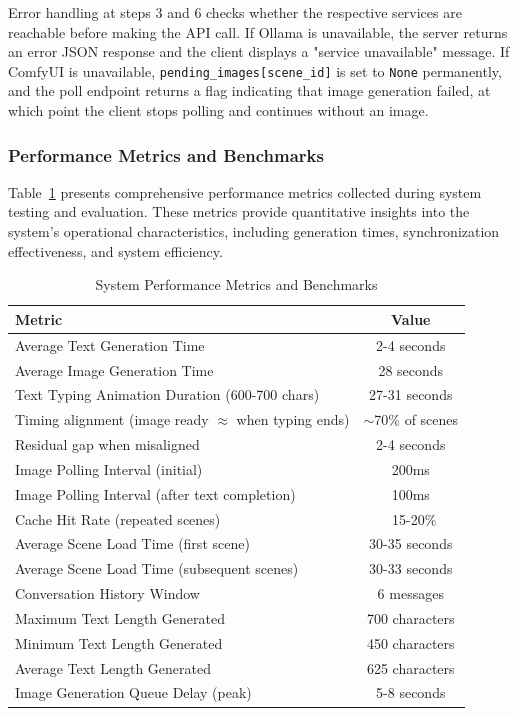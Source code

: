 \documentclass[12pt,a4paper]{article}
\begin{document}
Error handling at steps 3 and 6 checks whether the respective services are reachable before making the API call. If Ollama is unavailable, the server returns an error JSON response and the client displays a "service unavailable" message. If ComfyUI is unavailable, \texttt{pending\_images[scene\_id]} is set to \texttt{None} permanently, and the poll endpoint returns a flag indicating that image generation failed, at which point the client stops polling and continues without an image.

    \subsubsection{Performance Metrics and Benchmarks}

    Table~\ref{tab:performance_metrics} presents comprehensive performance metrics collected during system testing and evaluation. These metrics provide quantitative insights into the system's operational characteristics, including generation times, synchronization effectiveness, and system efficiency.

    \begin{table}[h]
    \centering
    \caption{System Performance Metrics and Benchmarks}
    \label{tab:performance_metrics}
    \begin{tabular}{lc}
    \toprule
    \textbf{Metric} & \textbf{Value} \\
    \midrule
    Average Text Generation Time & 2-4 seconds \\
    Average Image Generation Time & 28 seconds \\
    Text Typing Animation Duration (600-700 chars) & 27-31 seconds \\
Timing alignment (image ready $\approx$ when typing ends) & $\sim$70\% of scenes \\
Residual gap when misaligned & 2-4 seconds \\
    Image Polling Interval (initial) & 200ms \\
    Image Polling Interval (after text completion) & 100ms \\
    Cache Hit Rate (repeated scenes) & ~15-20\% \\
    Average Scene Load Time (first scene) & 30-35 seconds \\
    Average Scene Load Time (subsequent scenes) & 30-33 seconds \\
    Conversation History Window & 6 messages \\
    Maximum Text Length Generated & 700 characters \\
    Minimum Text Length Generated & 450 characters \\
    Average Text Length Generated & 625 characters \\
    Image Generation Queue Delay (peak) & 5-8 seconds \\
    \bottomrule
    \end{tabular}
    \end{table}
\end{document}
